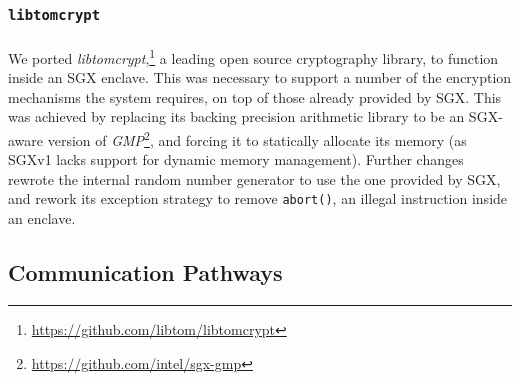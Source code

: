 \subsubsection{\texttt{libtomcrypt}}
\paragraph{} We ported \textit{libtomcrypt},\footnote{\url{https://github.com/libtom/libtomcrypt}} a leading open source cryptography library, to function inside an SGX enclave. This was necessary to support a number of the encryption mechanisms the system requires, on top of those already provided by SGX. This was achieved by replacing its backing precision arithmetic library to be an SGX-aware version of \textit{GMP}\footnote{\url{https://github.com/intel/sgx-gmp}}, and forcing it to statically allocate its memory (as SGXv1 lacks support for dynamic memory management). Further changes rewrote the internal random number generator to use the one provided by SGX, and rework its exception strategy to remove \texttt{abort()}, an illegal instruction inside an enclave.

\subsection{Communication Pathways}
\label{sec:interdomain-comms}
